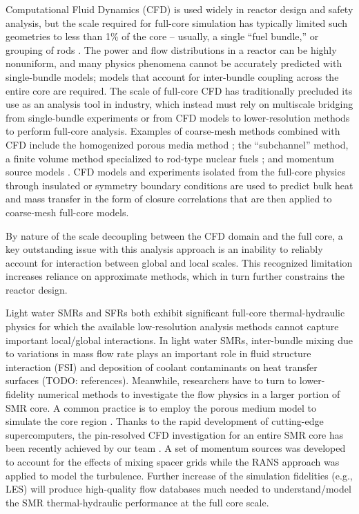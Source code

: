 Computational Fluid Dynamics (CFD) is used widely in reactor design and safety
analysis, but the scale required for full-core simulation has typically limited
such geometries to less than 1\% of the core -- usually, a single ``fuel
bundle,'' or grouping of rods \cite{wang2020,fanning,wang2020b}. The power and
flow distributions in a reactor can be highly nonuniform, and many physics
phenomena cannot be accurately predicted with single-bundle models; models that
account for inter-bundle coupling across the entire core are required.  The
scale of full-core CFD has traditionally precluded its use as an analysis tool
in industry,  which instead must rely on multiscale bridging from single-bundle
experiments or from CFD models to lower-resolution methods to perform full-core
analysis.  Examples of coarse-mesh methods combined with CFD include the
homogenized porous media method \cite{wang2020c}; the ``subchannel'' method, a
finite volume method specialized to rod-type nuclear fuels \cite{blyth}; and
momentum source models \cite{hu2013}. CFD models and experiments isolated from
the full-core physics through insulated or symmetry boundary conditions are
used to predict bulk heat and mass transfer in the form of closure correlations
that are then applied to coarse-mesh full-core models.

By nature of the scale decoupling between the CFD domain and the full core, a
key outstanding issue with this analysis approach is an inability to reliably 
account for interaction between global and local scales. This recognized
limitation increases reliance on approximate methods, which in turn further
constrains the reactor design.

Light water SMRs and SFRs both exhibit significant full-core thermal-hydraulic
physics for which the available low-resolution analysis methods cannot capture
important local/global interactions. In light water SMRs, inter-bundle mixing
due to variations in mass flow rate plays an important role in fluid structure
interaction (FSI) and deposition of coolant contaminants on heat transfer
surfaces (TODO: references). Meanwhile, researchers have to turn to lower-
fidelity numerical methods to investigate the flow physics in a larger portion
of SMR core. A common practice is to employ the porous
medium model to simulate the core region \cite{Kim2020}. Thanks to the rapid 
development of cutting-edge supercomputers, the pin-resolved CFD investigation
for an entire SMR core has been recently achieved by our team \cite{Fang2021}. 
A set of momentum sources was developed to account for the effects of mixing 
spacer grids while the RANS approach was applied to model the turbulence. Further
increase of the simulation fidelities (e.g., LES) will produce high-quality flow databases
much needed to understand/model the SMR thermal-hydraulic performance at the full
core scale. 

